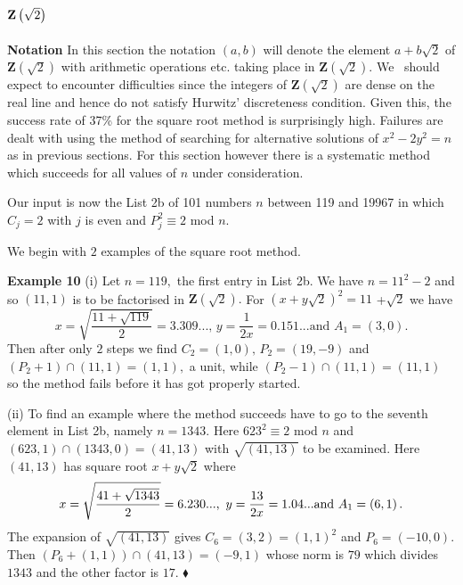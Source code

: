 \documentclass[12pt]{article}
\begin{document}
\section{$\mathbf{Z}\left( \protect\sqrt{2}\right) $\label{zpt}}

\textbf{Notation} In this section the notation $\left( a,b\right) $ will
denote the element $a+b\sqrt{2}$ of $\mathbf{Z}\left( \sqrt{2}\right) $ with
arithmetic operations etc. taking place in $\mathbf{Z}\left( \sqrt{2}\right)
.$ We \ should expect to encounter difficulties since the integers of $%
\mathbf{Z}\left( \sqrt{2}\right) $ are dense on the real line and hence do
not satisfy Hurwitz' discreteness condition. Given this, the success rate of
37\% for the square root method is surprisingly high. Failures are dealt
with using the method of searching for alternative solutions of $%
x^{2}-2y^{2}=n$ as in previous sections. For this section however there is a
systematic method which succeeds for all values of $n$ under consideration.

Our input is now the List 2b of 101 numbers $n$ between 119 and 19967 in
which $C_{j}=2$ with $j$ is even and $P_{j}^{2}\equiv 2$ mod $n$.

We begin with $2$ examples of the square root method.

\textbf{Example 10 }(i) Let $n=119,$ the first entry in List 2b. We have $%
n=11^{2}-2$ and so $\left( 11,1\right) $ is to be factorised in $\mathbf{Z}%
\left( \sqrt{2}\right) .$ For $\left( x+y\sqrt{2}\right) ^{2}=11$ +$\sqrt{2}$
we have 
\begin{equation*}
x=\sqrt{\frac{11+\sqrt{119}}{2}}=3.309...\text{, \ }y=\frac{1}{2x}=0.151...%
\text{and }A_{1}=\left( 3,0\right) .
\end{equation*}%
Then after only $2$ steps we find $C_{2}=\left( 1,0\right) ,\,P_{2}=\left(
19,-9\right) $ and $\left( P_{2}+1\right) \cap \left( 11,1\right) =\left(
1,1\right) ,$ a unit, while $\left( P_{2}-1\right) \cap \left( 11,1\right)
=\left( 11,1\right) $ so the method fails before it has got properly started.

(ii) To find an example where the method succeeds have to go to the seventh
element in List 2b, namely $n=1343.$ Here $623^{2}\equiv 2$ mod $n$ and $%
\left( 623,1\right) \cap \left( 1343,0\right) =\left( 41,13\right) $ with $%
\sqrt{\left( 41,13\right) }$ to be examined. Here $\left( 41,13\right) $ has
square root $x+y\sqrt{2}$ where 
\begin{equation*}
x=\sqrt{\frac{41+\sqrt{1343}}{2}}=6.230...\text{,\thinspace\ }y=\frac{13}{2x}%
=1.04...\text{and }A_{1}=\left( 6,1\right) .
\end{equation*}%
The expansion of $\sqrt{\left( 41,13\right) }$ gives $C_{6}=\left(
3,2\right) =\left( 1,1\right) ^{2}$ and $P_{6}=\left( -10,0\right) .$ Then $%
\left( P_{6}+\left( 1,1\right) \right) \cap \left( 41,13\right) =\left(
-9,1\right) $ whose norm is $79$ which divides $1343$ and the other factor
is $17$. $\blacklozenge $
\end{document}
